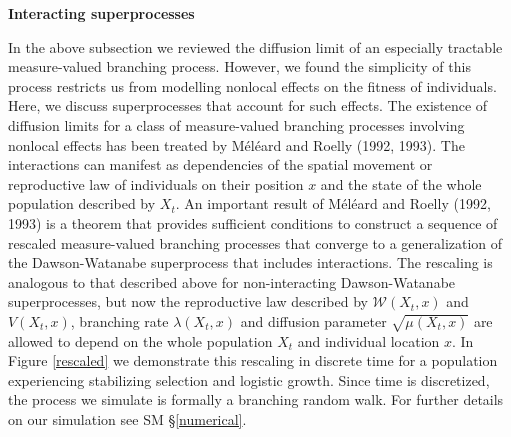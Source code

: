 \documentclass[]{article}
\begin{document}
\textbf{Interacting superprocesses}

In the above subsection we reviewed the diffusion limit of an especially
tractable measure-valued branching process. However, we found the
simplicity of this process restricts us from modelling nonlocal effects
on the fitness of individuals. Here, we discuss superprocesses that
account for such effects. The existence of diffusion limits for a class
of measure-valued branching processes involving nonlocal effects has
been treated by Méléard and Roelly (1992, 1993). The interactions can
manifest as dependencies of the spatial movement or reproductive law of
individuals on their position \(x\) and the state of the whole
population described by \(X_t\). An important result of Méléard and
Roelly (1992, 1993) is a theorem that provides sufficient conditions to
construct a sequence of rescaled measure-valued branching processes that
converge to a generalization of the Dawson-Watanabe superprocess that
includes interactions. The rescaling is analogous to that described
above for non-interacting Dawson-Watanabe superprocesses, but now the
reproductive law described by \(\mathscr{W}(X_t,x)\) and \(V(X_t,x)\),
branching rate \(\lambda(X_t,x)\) and diffusion parameter
\(\sqrt{\mu(X_t,x)}\) are allowed to depend on the whole population
\(X_t\) and individual location \(x\). In Figure \ref{rescaled} we
demonstrate this rescaling in discrete time for a population
experiencing stabilizing selection and logistic growth. Since time is
discretized, the process we simulate is formally a branching random
walk. For further details on our simulation see SM \S\ref{numerical}.
\end{document}
